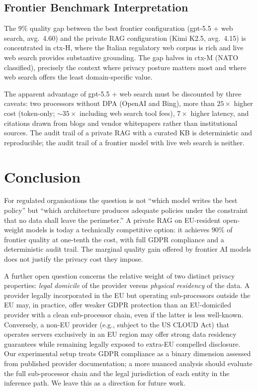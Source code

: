 \documentclass[runningheads]{llncs}
\begin{document}
\subsection{Frontier Benchmark Interpretation}

The 9\% quality gap between the best frontier configuration
(gpt-5.5 + web search, avg.\ 4.60) and the private RAG configuration
(Kimi K2.5, avg.\ 4.15) is concentrated in ctx-H, where the Italian
regulatory web corpus is rich and live web search provides substantive
grounding. The gap halves in ctx-M (NATO classified), precisely the context
where privacy posture matters most and where web search offers the least
domain-specific value.

The apparent advantage of gpt-5.5 + web search must be discounted by three
caveats: two processors without DPA (OpenAI and Bing), more than
$25\times$ higher cost (token-only; ${\sim}35\times$ including web search
tool fees), $7\times$ higher latency, and citations drawn from blogs and
vendor whitepapers rather than institutional sources. The audit trail of a private
RAG with a curated KB is deterministic and reproducible; the audit trail
of a frontier model with live web search is neither.


\section{Conclusion}

For regulated organisations the question is not ``which model writes the
best policy'' but ``which architecture produces adequate policies under the
constraint that no data shall leave the perimeter.'' A private RAG on
EU-resident open-weight models is today a technically competitive option:
it achieves 90\% of frontier quality at one-tenth the cost, with full GDPR
compliance and a deterministic audit trail. The marginal quality gain
offered by frontier AI models does not justify the privacy cost they impose.

A further open question concerns the relative weight of two distinct
privacy properties: \textit{legal domicile} of the provider versus
\textit{physical residency} of the data. A provider legally incorporated
in the EU but operating sub-processors outside the EU may, in practice,
offer weaker GDPR protection than an EU-domiciled provider with a clean
sub-processor chain, even if the latter is less well-known. Conversely,
a non-EU provider (e.g., subject to the US CLOUD Act) that operates
servers exclusively in an EU region may offer strong data residency
guarantees while remaining legally exposed to extra-EU compelled
disclosure. Our experimental setup treats GDPR compliance as a binary
dimension assessed from published provider documentation; a more nuanced
analysis should evaluate the full sub-processor chain and the legal
jurisdiction of each entity in the inference path. We leave this as a
direction for future work.
\end{document}

